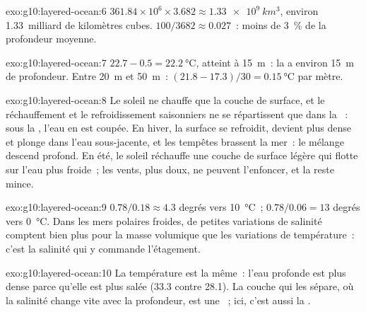 \begin{solution}{exo:g10:layered-ocean:6}
$361.84\times10^6 \times 3.682 \approx \qty{1.33e9}{km^3}$, environ
\num{1.33}~milliard de kilomètres cubes. $100/3682 \approx 0.027$~: moins
de \qty{3}{\percent} de la profondeur moyenne.
\end{solution}

\begin{solution}{exo:g10:layered-ocean:7}
$22.7 - 0.5 = \qty{22.2}{\degreeCelsius}$, atteint à \qty{15}{m}~: la  a environ \qty{15}{m} de profondeur. Entre \qty{20}{m} et
\qty{50}{m}~:
$(21.8 - 17.3)/30 = \qty{0.15}{\degreeCelsius}$ par mètre.
\end{solution}

\begin{solution}{exo:g10:layered-ocean:8}
Le soleil ne chauffe que la couche de surface, et le réchauffement et le
refroidissement saisonniers ne se répartissent que dans la ~: sous la , l'eau en est coupée. En hiver, la surface se
refroidit, devient plus dense et plonge dans l'eau sous-jacente, et les
tempêtes brassent la mer~: le mélange descend profond. En été, le soleil
réchauffe une couche de surface légère qui flotte sur l'eau plus froide~;
les vents, plus doux, ne peuvent l'enfoncer, et la  reste
mince.
\end{solution}

\begin{solution}{exo:g10:layered-ocean:9}
$0.78/0.18 \approx 4.3$ degrés vers \qty{10}{\degreeCelsius}~;
$0.78/0.06 = 13$ degrés vers \qty{0}{\degreeCelsius}. Dans les mers
polaires froides, de petites variations de salinité comptent bien plus pour
la masse volumique que les variations de température~: c'est la salinité
qui y commande l'étagement.
\end{solution}

\begin{solution}{exo:g10:layered-ocean:10}
La température est la même~: l'eau profonde est plus dense parce qu'elle
est plus salée (33.3 contre 28.1). La couche qui les sépare, où la salinité
change vite avec la profondeur, est une ~; ici, c'est aussi la
.
\end{solution}

